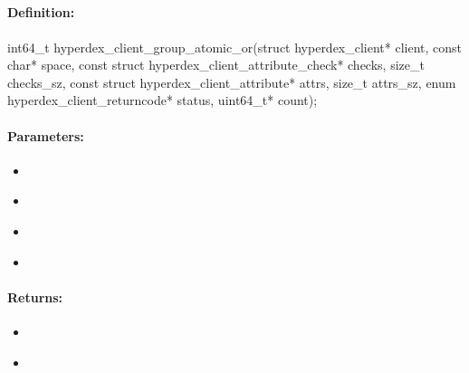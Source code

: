 \pagebreak
\subsection{}
\label{api:c:group_atomic_or}


\paragraph{Definition:}
\begin{ccode}
int64_t hyperdex_client_group_atomic_or(struct hyperdex_client* client,
        const char* space,
        const struct hyperdex_client_attribute_check* checks, size_t checks_sz,
        const struct hyperdex_client_attribute* attrs, size_t attrs_sz,
        enum hyperdex_client_returncode* status,
        uint64_t* count);
\end{ccode}

\paragraph{Parameters:}
\begin{itemize}[noitemsep]
\item {}\\

\item {}\\

\item {}\\

\item {}\\

\end{itemize}

\paragraph{Returns:}
\begin{itemize}[noitemsep]
\item {}\\

\item {}\\

\end{itemize}


